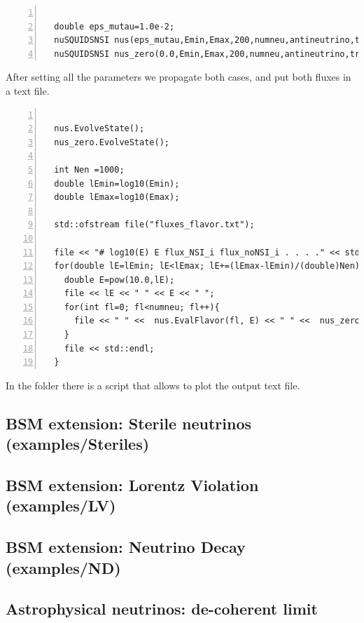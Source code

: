 \begin{lstlisting}[frame=leftline, numbers =
  left,breaklines=true,label = ex:sin1,firstnumber=last]

  double eps_mutau=1.0e-2;
  nuSQUIDSNSI nus(eps_mutau,Emin,Emax,200,numneu,antineutrino,true,false);
  nuSQUIDSNSI nus_zero(0.0,Emin,Emax,200,numneu,antineutrino,true,false);
\end{lstlisting}

After setting all the parameters we propagate both cases, and put both
fluxes in a text file.

\begin{lstlisting}[frame=leftline, numbers =
  left,breaklines=true,label = ex:sin1,firstnumber=last]

  nus.EvolveState();
  nus_zero.EvolveState();

  int Nen =1000;
  double lEmin=log10(Emin);
  double lEmax=log10(Emax);
  
  std::ofstream file("fluxes_flavor.txt");

  file << "# log10(E) E flux_NSI_i flux_noNSI_i . . . ." << std::endl;
  for(double lE=lEmin; lE<lEmax; lE+=(lEmax-lEmin)/(double)Nen){
    double E=pow(10.0,lE);
    file << lE << " " << E << " ";
    for(int fl=0; fl<numneu; fl++){
      file << " " <<  nus.EvalFlavor(fl, E) << " " <<  nus_zero.EvalFlavor(fl, E);
    }
    file << std::endl;
  }

\end{lstlisting}

In the folder there is a script that allows to plot the output text
file.


\subsection{BSM extension:  Sterile neutrinos \textnormal{({\ttf examples/Steriles})}}

\subsection{BSM extension: Lorentz Violation \textnormal{({\ttf examples/LV})}}

\subsection{BSM extension: Neutrino Decay \textnormal{({\ttf examples/ND})}}

\subsection{Astrophysical neutrinos: de-coherent limit}

